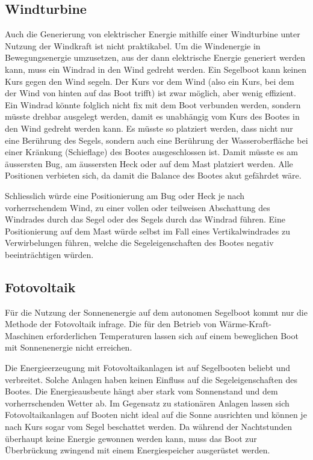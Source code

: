 \subsection{Windturbine}
Auch die Generierung von elektrischer Energie mithilfe einer Windturbine unter Nutzung der Windkraft ist nicht praktikabel. Um die Windenergie in Bewegungsenergie umzusetzen, aus der dann elektrische Energie generiert werden kann, muss ein Windrad in den Wind gedreht werden. Ein Segelboot kann keinen Kurs gegen den Wind segeln. Der Kurs vor dem Wind (also ein Kurs, bei dem der Wind von hinten auf das Boot trifft) ist zwar möglich, aber wenig effizient. Ein Windrad könnte folglich nicht fix mit dem Boot verbunden werden, sondern müsste drehbar ausgelegt werden, damit es unabhängig vom Kurs des Bootes in den Wind gedreht werden kann. Es müsste so platziert werden, dass nicht nur eine Berührung des Segels, sondern auch eine Berührung der Wasseroberfläche bei einer Kränkung (Schieflage) des Bootes ausgeschlossen ist. Damit müsste es am äussersten Bug, am äussersten Heck oder auf dem Mast platziert werden. Alle Positionen verbieten sich, da damit die Balance des Bootes akut gefährdet wäre. 

Schliesslich würde eine Positionierung am Bug oder Heck je nach vorherrschendem Wind, zu einer vollen oder teilweisen Abschattung des Windrades durch das Segel oder des Segels durch das Windrad führen. Eine Positionierung auf dem Mast würde selbst im Fall eines Vertikalwindrades zu Verwirbelungen führen, welche die Segeleigenschaften des Bootes negativ beeinträchtigen würden.

\subsection{Fotovoltaik}
Für die Nutzung der Sonnenenergie auf dem autonomen Segelboot kommt nur die Methode der Fotovoltaik infrage. Die für den Betrieb von Wärme-Kraft-Maschinen erforderlichen Temperaturen lassen sich auf einem beweglichen Boot mit Sonnenenergie nicht erreichen.

Die Energieerzeugung mit Fotovoltaikanlagen ist auf Segelbooten beliebt und verbreitet. Solche Anlagen haben keinen Einfluss auf die Segeleigenschaften des Bootes. Die Energieausbeute hängt aber stark vom Sonnenstand und dem vorherrschenden Wetter ab. Im Gegensatz zu stationären Anlagen lassen sich Fotovoltaikanlagen auf Booten nicht ideal auf die Sonne ausrichten und können je nach Kurs sogar vom Segel beschattet werden. Da während der Nachtstunden überhaupt keine Energie gewonnen werden kann, muss das Boot zur Überbrückung zwingend mit einem Energiespeicher ausgerüstet werden.

